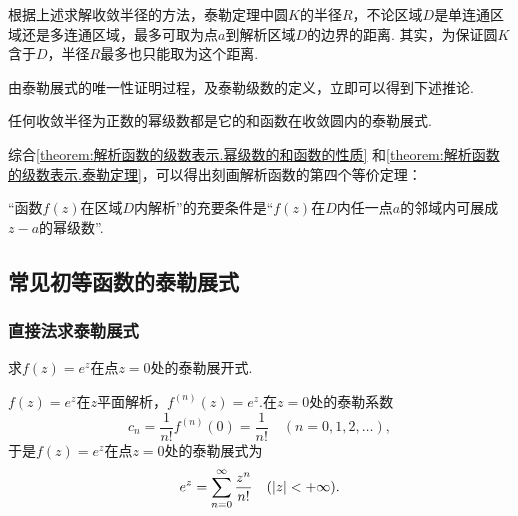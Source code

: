 根据上述求解收敛半径的方法，泰勒定理中圆\(K\)的半径\(R\)，不论区域\(D\)是单连通区域还是多连通区域，最多可取为点\(a\)到解析区域\(D\)的边界的距离.
其实，为保证圆\(K\)含于\(D\)，半径\(R\)最多也只能取为这个距离.

由泰勒展式的唯一性证明过程，及泰勒级数的定义，立即可以得到下述推论.
\begin{corollary}
任何收敛半径为正数的幂级数都是它的和函数在收敛圆内的泰勒展式.
\end{corollary}

综合\cref{theorem:解析函数的级数表示.幂级数的和函数的性质} 和\cref{theorem:解析函数的级数表示.泰勒定理}，可以得出刻画解析函数的第四个等价定理：
\begin{theorem}
“函数\(f(z)\)在区域\(D\)内解析”的充要条件是“\(f(z)\)在\(D\)内任一点\(a\)的邻域内可展成\(z-a\)的幂级数”.
\end{theorem}

\subsection{常见初等函数的泰勒展式}
\subsubsection{直接法求泰勒展式}
\begin{example}
求\(f(z) = e^z\)在点\(z = 0\)处的泰勒展开式.
\begin{solution}
\(f(z) = e^z\)在\(z\)平面解析，\(f^{(n)}(z) = e^z\).在\(z = 0\)处的泰勒系数\[
c_n = \frac{1}{n!} f^{(n)}(0) = \frac{1}{n!}
\quad(n=0,1,2,\dotsc),
\]于是\(f(z) = e^z\)在点\(z = 0\)处的泰勒展式为\begin{equation}\label{equation:解析函数的级数表示.指数函数的泰勒展式}
e^z = \sum\limits_{n=0}^\infty \frac{z^n}{n!}
\quad(\abs{z} < +\infty).
\end{equation}
\end{solution}
\end{example}

